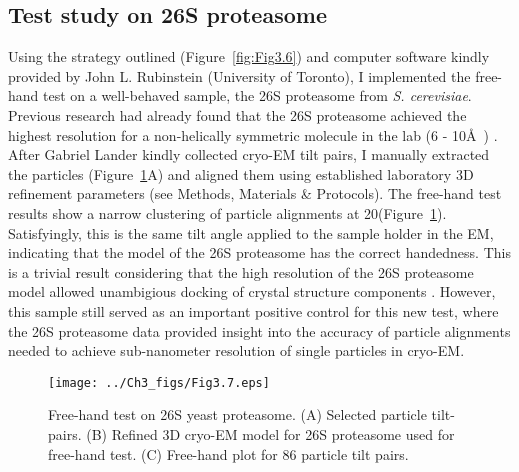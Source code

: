 \subsection{Test study on 26S proteasome}

Using the strategy outlined (Figure~\ref{fig:Fig3.6}) and computer software kindly provided by John L. Rubinstein (University of Toronto), I implemented the free-hand test on a well-behaved sample, the 26S proteasome from \emph{S. cerevisiae}. Previous research had already found that the 26S proteasome achieved the highest resolution for a non-helically symmetric molecule in the lab (6 - 10\AA\ ) \cite{Lander_2012}. After Gabriel Lander kindly collected cryo-EM tilt pairs, I manually extracted the particles (Figure~\ref{fig:Fig3.7}A) and aligned them using established laboratory 3D refinement parameters (see Methods, Materials \& Protocols). The free-hand test results show a narrow clustering of particle alignments at 20\textdegree (Figure~\ref{fig:Fig3.7}). Satisfyingly, this is the same tilt angle applied to the sample holder in the EM, indicating that the model of the 26S proteasome has the correct handedness.  This is a trivial result considering that the high resolution of the 26S proteasome model allowed unambigious docking of crystal structure components \cite{Lander_2012}. However, this sample still served as an important positive control for this new test, where the 26S proteasome data provided insight into the accuracy of particle alignments needed to achieve sub-nanometer resolution of single particles in cryo-EM. \\
\begin{figure}
\centering
\texttt{[image: ../Ch3\_figs/Fig3.7.eps]}
\caption[Free-hand test on 26S yeast proteasome]{Free-hand test on 26S yeast proteasome. (A) Selected particle tilt-pairs.  (B) Refined 3D cryo-EM model for 26S proteasome used for free-hand test.  (C) Free-hand plot for 86 particle tilt pairs.}
\label{fig:Fig3.7}
\end{figure}
\indent 

